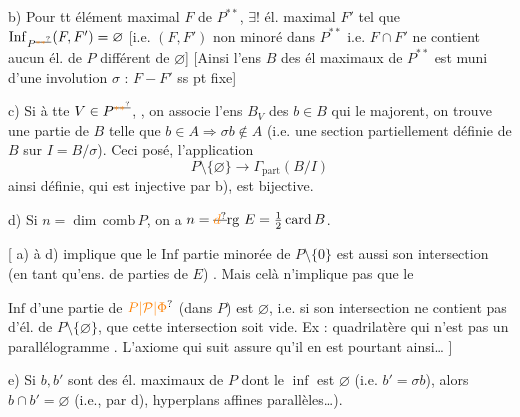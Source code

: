 b) Pour tt élément maximal $F$ de $P^{**}$, $\exists!$
él. maximal $F'$ tel que $\mathrm{Inf}_{P^{\deleted{\unsure{**}}}}(F,F')=\varnothing$ [i.e.
$(F,F')$ non minoré dans $P^{**}$ i.e. $F\cap F'$ ne contient
aucun él. de $P$ différent de $\varnothing$] [Ainsi l'ens
$B$ des él maximaux de $P^{**}$ est muni d'une involution $\sigma$ :
$F-F'$ ss pt fixe]

c) Si à tte $V\in P^{\deleted{\unsure{**}}}$, , on associe l'ens  $B_V$
des $b\in B$ qui le majorent, on trouve
une partie  de $B$ telle que $b\in A\Longrightarrow\sigma b\notin A$
(i.e. une section partiellement définie de $B$
sur $I=B/\sigma$). Ceci posé, l'application
\[
P\setminus\{\varnothing\}\longrightarrow\Gamma_{\mathrm{part}}(B/I)
\]
ainsi définie, qui est injective par b), est bijective.

d) Si $n=\dim\,\mathrm{comb}\,P$, on a  $n=\deleted{\unsure{d}}\mathrm{rg}\ E
=\frac12\operatorname{card} B$.

[ a) à d) implique que 
le $\mathrm{Inf}$  
partie minorée de $P\setminus\{0\}$ est aussi son
intersection (en tant qu'ens. de parties
de $E$) . Mais celà n'implique pas que le

$\mathrm{Inf}$ d'une partie de $\unsure{P|\mathcal P|\Phi}$ (dans $P$) est $\varnothing$, i.e. si son
intersection ne contient pas d'él. de $P\setminus\{\varnothing\}$,
que cette intersection soit vide. Ex :  quadrilatère
qui n'est pas un parallélogramme
.
L'axiome qui suit assure qu'il en est
pourtant ainsi\ldots{} ]

e) Si $b,b'$ sont des él. maximaux de $P$
 dont le $\inf$ est $\varnothing$ (i.e. $b'=\sigma b$), alors 
$b\cap b'=\varnothing$ (i.e.,  par d), 
hyperplans affines parallèles\ldots).

